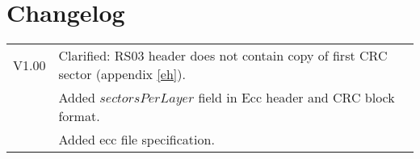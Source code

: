 \section{Changelog}

\begin{tabular}{lp{14cm}}
V1.00 & Clarified: RS03 header does not contain copy of first CRC sector (appendix \ref{eh}). \\
      & Added $sectorsPerLayer$ field in Ecc header and CRC block format.\\
      & Added ecc file specification.\\
\end{tabular}

\newpage
